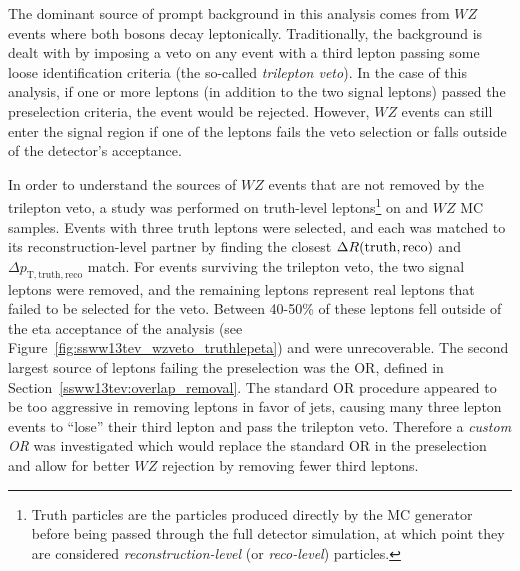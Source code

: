 The dominant source of prompt background in this analysis comes from $WZ$ events where both bosons decay leptonically.
Traditionally, the background is dealt with by imposing a veto on any event with a third lepton passing some loose identification criteria (the so-called \emph{trilepton veto}).
In the case of this analysis, if one or more leptons (in addition to the two signal leptons) passed the preselection criteria, the event would be rejected.
However, $WZ$ events can still enter the signal region if one of the leptons fails the veto selection or falls outside of the detector's acceptance.

In order to understand the sources of $WZ$ events that are not removed by the trilepton veto, a study was performed on truth-level leptons\footnote{Truth particles are the particles produced directly by the MC generator before being passed through the full detector simulation, at which point they are considered \emph{reconstruction-level} (or \emph{reco-level}) particles.} on \ssww and $WZ$ MC samples.
Events with three truth leptons were selected, and each was matched to its reconstruction-level partner by finding the closest $\Delta R(\textrm{truth},\textrm{reco})$ and $\Delta p_{\textrm{T},\textrm{truth},\textrm{reco}}$ match.
For events surviving the trilepton veto, the two signal leptons were removed, and the remaining leptons represent real leptons that failed to be selected for the veto.
Between 40-50\% of these leptons fell outside of the eta acceptance of the analysis (see Figure~\ref{fig:ssww13tev_wzveto_truthlepeta}) and were unrecoverable.
The second largest source of leptons failing the preselection was the OR, defined in Section~\ref{ssww13tev:overlap_removal}.
The standard OR procedure appeared to be too aggressive in removing leptons in favor of jets, causing many three lepton events to ``lose'' their third lepton and pass the trilepton veto.
Therefore a \emph{custom OR} was investigated which would replace the standard OR in the preselection and allow for better $WZ$ rejection by removing fewer third leptons.


